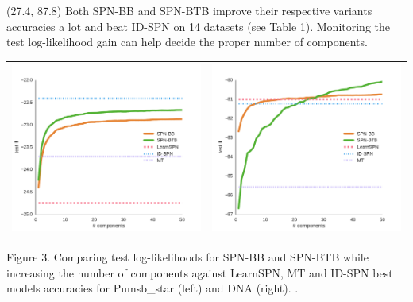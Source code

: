 \documentclass[final]{beamer}
\begin{document}
\begin{frame}{}
\begin{textblock}{25.2}
    

  \end{textblock}
  
  \begin{textblock}{25.2}(27.4, 87.8)
    \footnotesize
    Both \textsf{SPN-BB} and \textsf{SPN-BTB} improve their respective
    variants accuracies a lot and beat \textsf{ID-SPN} on 14 datasets
    (see Table 1). Monitoring the test log-likelihood gain can help
    decide the proper number of components.
    \begin{table}[ht]
      \setlength{\tabcolsep}{30pt}  
      \centering
      \begin{tabular}{c c}
        \includegraphics[width=0.4\linewidth]{figures/curves/pumsb-star-png.pdf}&\includegraphics[width=0.4\linewidth]{figures/curves/dna-png.pdf}
      \end{tabular}
    \end{table}
    \vspace{-20pt}
    \begin{center}
      \begin{minipage}[t]{0.9\linewidth}
        \tiny\flushleft
        Figure 3. Comparing test log-likelihoods for \textsf{SPN-BB} and
        \textsf{SPN-BTB} while increasing the number of components against \textsf{LearnSPN}, \textsf{MT} and
        \textsf{ID-SPN} best models accuracies for Pumsb\_star (left)
        and DNA (right).
        .
      \end{minipage}
    \end{center}
  \end{textblock}
  

\end{frame}
\end{document}
